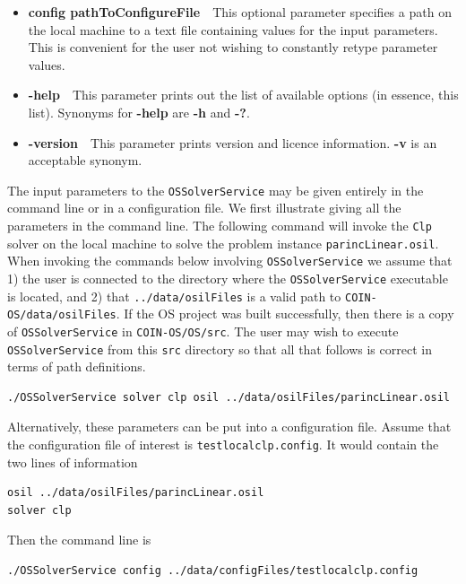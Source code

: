 \begin{itemize}
\item[] {\bf config pathToConfigureFile}\ \ This optional parameter specifies a path on the local machine 
to a text file containing values for the input parameters. This is convenient for the user not wishing 
to constantly retype parameter values.

\item[] {\bf -help}\ \  This parameter prints out the list of available options (in essence, this list).
Synonyms for {\bf -help} are {\bf -h} and {\bf -?}.

\item[] {\bf -version}\ \ This parameter prints version and licence information. {\bf -v} is an acceptable synonym.

\end{itemize}



The input parameters to the {\tt OSSolverService} may be given entirely in the command line or in a configuration file.
We first illustrate giving all the  parameters in the command line. The following command will invoke the
{\tt Clp} solver on the local machine to solve the problem instance
{\tt parincLinear.osil}.
When invoking the commands below involving {\tt OSSolverService} we assume that
1) the user is connected to the directory where the {\tt OSSolverService} executable is located, and
2) that {\tt ../data/osilFiles} is a valid path to {\tt COIN-OS/data/osilFiles}.  If the OS project was built successfully,
then there is a copy of  {\tt OSSolverService} in {\tt COIN-OS/OS/src}. The user may wish to execute {\tt OSSolverService}
from this {\tt src} directory so that all that follows is correct in terms of path definitions.


\begin{verbatim}
./OSSolverService solver clp osil ../data/osilFiles/parincLinear.osil
\end{verbatim}

Alternatively, these parameters can be put into a configuration file.
Assume that the configuration file of interest is {\tt testlocalclp.config}.
It would contain the two lines of information
\begin{verbatim}
osil ../data/osilFiles/parincLinear.osil
solver clp
\end{verbatim}
Then the command line is
\begin{verbatim}
./OSSolverService config ../data/configFiles/testlocalclp.config
\end{verbatim}

